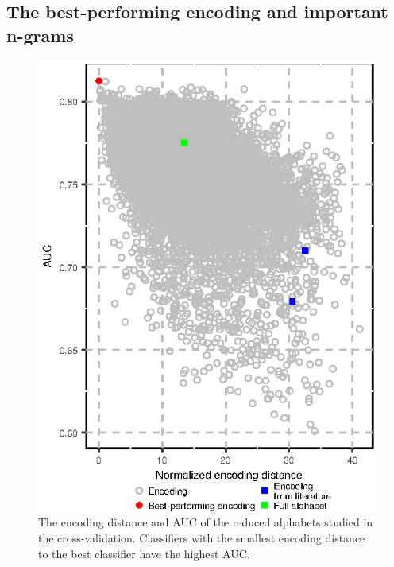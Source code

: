 \documentclass[a4,center,fleqn]{NAR}
\begin{document}
\subsection{The best-performing encoding and important n-grams}

\begin{figure}[!tpb]
\centerline{\includegraphics{figures/ed_AUC.eps}}
\caption{The encoding distance and AUC of the reduced alphabets studied in the 
cross-validation. 
Classifiers with the smallest encoding distance to the best classifier have 
the highest AUC.}\label{fig:ed_AUC}
\end{figure}
\end{document}
